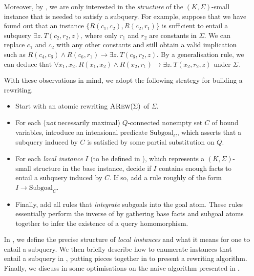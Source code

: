 \documentclass[12pt]{report}
\theoremstyle{plain}
\theoremstyle{definition}
\newcommand{\ARew}[1]{\ensuremath{\normalfont{\textsc{ARew}}\!\left( #1 \right)}}
\begin{document}
Moreover, by , we are only interested in the \emph{structure} of the $(K, \Sigma)$-small instance that is needed to satisfy a subquery. For example, suppose that we have found out that an instance $\{R(c_1, c_2), R(c_2, r_1)\}$ is sufficient to entail a subquery $\exists z.\ T(c_2, r_2, z)$, where only $r_1$ and $r_2$ are constants in $\Sigma$. We can replace $c_1$ and $c_2$ with any other constants and still obtain a valid implication such as $R(c_4, c_6) \wedge R(c_6, r_1) \rightarrow \exists z.\ T(c_6, r_2, z)$. By a generalisation rule, we can deduce that $\forall x_1, x_2.\ R(x_1, x_2) \wedge R(x_2, r_1) \rightarrow \exists z.\ T(x_2, r_2, z)$ under $\Sigma$.

With these observations in mind, we adopt the following strategy for building a rewriting.

\begin{itemize}
  \item Start with an atomic rewriting $\ARew{\Sigma}$ of $\Sigma$.
  \item For each (\emph{not} necessarily maximal) $Q$-connected nonempty set $C$ of bound variables, introduce an intensional predicate $\mathrm{Subgoal}_C$, which asserts that a subquery induced by $C$ is satisfied by some partial substitution on $Q$.
  \item For each \emph{local instance} $I$ (to be defined in ), which represents a $(K, \Sigma)$-small structure in the base instance, decide if $I$ contains enough facts to entail a subquery induced by $C$. If so, add a rule roughly of the form $I \rightarrow \mathrm{Subgoal}_C$.
  \item Finally, add all rules that \emph{integrate} subgoals into the goal atom. These rules essentially perform the inverse of  by gathering base facts and subgoal atoms together to infer the existence of a query homomorphism.
\end{itemize}

In , we define the precise structure of \emph{local instances} and what it means for one to entail a subquery. We then briefly describe how to enumerate instances that entail a subquery in , putting pieces together in  to present a rewriting algorithm. Finally, we discuss in  some optimisations on the naive algorithm presented in .
\end{document}
